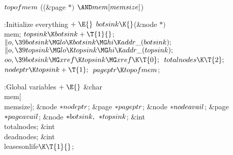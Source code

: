 \Y\B\4\D$\\{topofmem}$ \5
((\&{page} ${}{*}){}$ ${}{\AND}\\{mem}[\\{memsize}]{}$)\par
\Y\B\4:Initialize everything\X${}\mathrel+\E{}$\6
$\\{botsink}\K{}$(\&{node} ${}{*}){}$ \\{mem};\6
${}\\{topsink}\K\\{botsink}+\T{1}{}$;\6
${}\|o,\39\\{botsink}\MG\\{lo}\K\\{botsink}\MG\\{hi}\K\\{addr\_}(%
\\{botsink});{}$\6
${}\|o,\39\\{topsink}\MG\\{lo}\K\\{topsink}\MG\\{hi}\K\\{addr\_}(%
\\{topsink});{}$\6
${}\\{oo},\39\\{botsink}\MG\\{xref}\K\\{topsink}\MG\\{xref}\K\T{0};{}$\6
${}\\{totalnodes}\K\T{2};{}$\6
${}\\{nodeptr}\K\\{topsink}+\T{1};{}$\6
${}\\{pageptr}\K\\{topofmem}{}$;\par
\fi

\B{}:Global variables\X${}\mathrel+\E{}$\6
\&{char} \\{mem}[\\{memsize}];\6
\&{node} ${}{*}\\{nodeptr}{}$;\6
\&{page} ${}{*}\\{pageptr}{}$;\6
\&{node} ${}{*}\\{nodeavail}{}$;\6
\&{page} ${}{*}\\{pageavail}{}$;\6
\&{node} ${}{*}\\{botsink},{}$ ${}{*}\\{topsink}{}$;\6
\&{int} \\{totalnodes};\6
\&{int} \\{deadnodes};\6
\&{int} \\{leasesonlife}${}\K\T{1}{}$;\par
\fi

